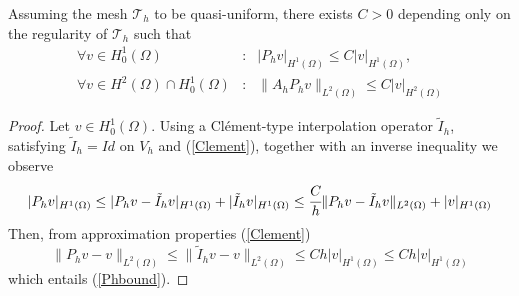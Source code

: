 \documentclass{imanum}
\begin{document}
\begin{lemma} \label{bound_AhPhu}
Assuming the mesh $\mathcal{T}_h$ to be quasi-uniform, there exists  $C>0$ depending only on the regularity of $\mathcal{T}_h$ such that
\begin{eqnarray}\label{Phbound}
\forall v \in H^1_0 (\Omega) & :  & | P_h v |_{H^1(\Omega)} \leq C | v |_{H^1(\Omega)},
\\
\label{AhPhbound}
\forall v \in H^2 (\Omega) \cap H^1_0 (\Omega) & : & \| A_hP_h v \|_{L^2(\Omega)} \leq C | v |_{H^2(\Omega)}
\end{eqnarray} 

\end{lemma}
\begin{proof}
Let $ v \in H^1_0 (\Omega)$. 
Using a Cl{\'e}ment-type interpolation operator $\tilde I_h$, satisfying $\tilde I_h=Id$ on $V_h$ and (\ref{Clement}), together with an inverse inequality we observe 
\[
| P_h v |_{H^1(\Omega)} 
\leq | P_h v  -\tilde I_hv  |_{H^1(\Omega)} + | \tilde I_h v  |_{H^1(\Omega)} \leq \cfrac{C}{h}\| P_h v  -\tilde I_hv  \|_{L^2(\Omega)} + | v |_{H^1(\Omega)}
\]
Then, from approximation properties (\ref{Clement}) 
\[\| P_h v  -v  \|_{L^2(\Omega)} \leq \| \tilde I_h v  -v  \|_{L^2(\Omega)}  \leq C h| v  |_{H^1(\Omega)}
 \leq C h| v |_{H^1(\Omega)}
 \]
which entails (\ref{Phbound}).


\end{proof}
\end{document}
